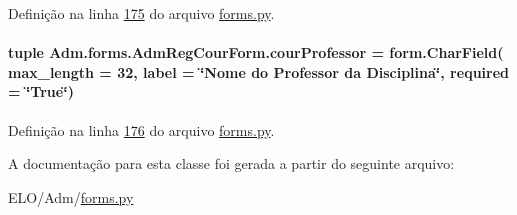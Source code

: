 Definição na linha \hyperlink{Adm_2forms_8py_source_l00175}{175} do arquivo \hyperlink{Adm_2forms_8py_source}{forms.\-py}.

\hypertarget{classAdm_1_1forms_1_1AdmRegCourForm_a6fcfad36a149364899dc7c95f239691f}{
\paragraph[{cour\-Professor}]{\setlength{\rightskip}{0pt plus 5cm}tuple Adm.\-forms.\-Adm\-Reg\-Cour\-Form.\-cour\-Professor = form.\-Char\-Field( max\-\_\-length = 32, label = \char`\"{}Nome do Professor da Disciplina\char`\"{}, required = \char`\"{}True\char`\"{})\hspace{0.3cm}{\ttfamily [static]}}}\label{classAdm_1_1forms_1_1AdmRegCourForm_a6fcfad36a149364899dc7c95f239691f}


Definição na linha \hyperlink{Adm_2forms_8py_source_l00176}{176} do arquivo \hyperlink{Adm_2forms_8py_source}{forms.\-py}.



A documentação para esta classe foi gerada a partir do seguinte arquivo\-:\begin{DoxyCompactItemize}
\item 
E\-L\-O/\-Adm/\hyperlink{Adm_2forms_8py}{forms.\-py}\end{DoxyCompactItemize}
